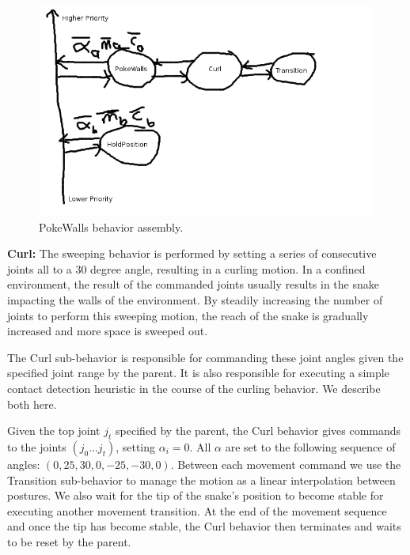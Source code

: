 \begin{figure}[htbp]
\centering
\includegraphics[keepaspectratio,width=400pt,height=0.75\textheight]{4_pokewalls_1.png}
\caption{PokeWalls behavior assembly.}
\label{pokewalls1}
\end{figure}






\textbf{Curl:} The sweeping behavior is performed by setting a series of consecutive joints all to a 30 degree angle, resulting in a curling motion. In a confined environment, the result of the commanded joints usually results in the snake impacting the walls of the environment. By steadily increasing the number of joints to perform this sweeping motion, the reach of the snake is gradually increased and more space is sweeped out.

The Curl sub-behavior is responsible for commanding these joint angles given the specified joint range by the parent. It is also responsible for executing a simple contact detection heuristic in the course of the curling behavior. We describe both here. 

Given the top joint $j_t$ specified by the parent, the Curl behavior gives commands to the joints $(j_0 ... j_t)$, setting $\alpha_i = 0$. All $\alpha$ are set to the following sequence of angles: $(0, 25, 30, 0, -25, -30, 0)$. Between each movement command we use the Transition sub-behavior to manage the motion as a linear interpolation between postures. We also wait for the tip of the snake's position to become stable for executing another movement transition. At the end of the movement sequence and once the tip has become stable, the Curl behavior then terminates and waits to be reset by the parent. 

